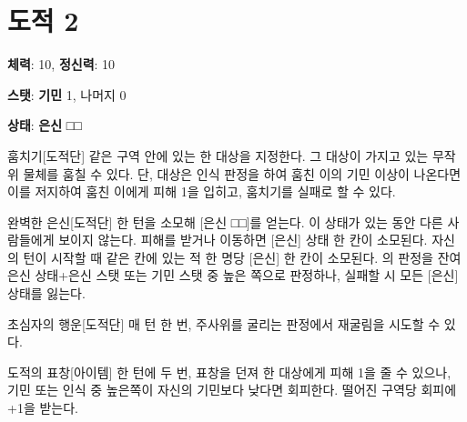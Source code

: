 \documentclass{report}
\begin{document}
	\section*{도적 2}
	\textbf{체력}: 10, \textbf{정신력}: 10
	
	\textbf{스탯}: \textbf{기민} 1, 나머지 0
	
	\textbf{상태}: \textbf{은신} □□
	
	\begin{spoiler}{훔치기}{[도적단]}
		같은 구역 안에 있는 한 대상을 지정한다. 그 대상이 가지고 있는 무작위 물체를 훔칠 수 있다. 단, 대상은 인식 판정을 하여 훔친 이의 기민 이상이 나온다면 이를 저지하여 훔친 이에게 피해 1을 입히고, 훔치기를 실패로 할 수 있다.
	\end{spoiler}
	
	\begin{spoiler}{완벽한 은신}{[도적단]}
		한 턴을 소모해 [은신 □□]를 얻는다. 이 상태가 있는 동안 다른 사람들에게 보이지 않는다. 피해를 받거나 이동하면 [은신] 상태 한 칸이 소모된다. 자신의 턴이 시작할 때 같은 칸에 있는 적 한 명당 [은신] 한 칸이 소모된다. 의 판정을 잔여 은신 상태+은신 스탯 또는 기민 스탯 중 높은 쪽으로 판정하나, 실패할 시 모든 [은신] 상태를 잃는다.
	\end{spoiler}
	
	\begin{spoiler}{초심자의 행운}{[도적단]}
		매 턴 한 번, 주사위를 굴리는 판정에서 재굴림을 시도할 수 있다.
	\end{spoiler}
	
	\begin{spoiler}{도적의 표창}{[아이템]}
		한 턴에 두 번, 표창을 던져 한 대상에게 피해 1을 줄 수 있으나, 기민 또는 인식 중 높은쪽이 자신의 기민보다 낮다면 회피한다. 떨어진 구역당 회피에 +1을 받는다.
	\end{spoiler}
\end{document}

